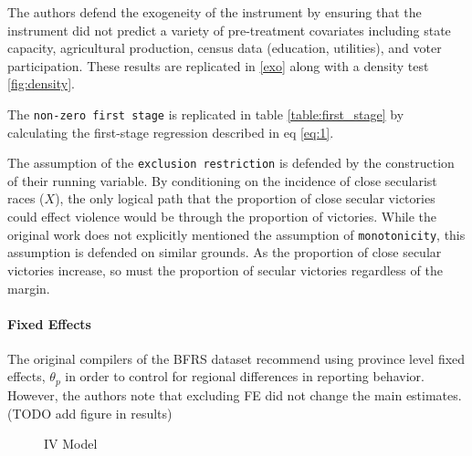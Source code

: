 \documentclass{scrartcl}
\begin{document}
The authors defend the exogeneity of the instrument by ensuring that the instrument did not predict a variety of pre-treatment covariates including state capacity, agricultural production, census data (education, utilities), and voter participation. These results are replicated in \ref{exo} along with a density test \ref{fig:density}.

The \texttt{non-zero first stage} is replicated in table \ref{table:first_stage} by calculating the first-stage regression described in eq \ref{eq:1}.

The assumption of the \texttt{exclusion restriction} is defended by the construction of their running variable.
By conditioning on the incidence of close secularist races ($X$), the only logical path that the proportion of close secular victories could effect violence would be through the proportion of victories. 
While the original work does not explicitly mentioned the assumption of \texttt{monotonicity}, this assumption is defended on similar grounds. As the proportion of close secular victories increase, so must the proportion of secular victories regardless of the margin.

\paragraph{Fixed Effects}
The original compilers of the BFRS dataset recommend using province level fixed effects, $\theta_p$ in order to control for regional differences in reporting behavior.
However, the authors note that excluding FE did not change the main estimates. (TODO add figure in results)


\begin{figure}[h]
  \centering
  \caption{IV Model}
  \label{fig:ate_iv}
\end{figure}
\end{document}
